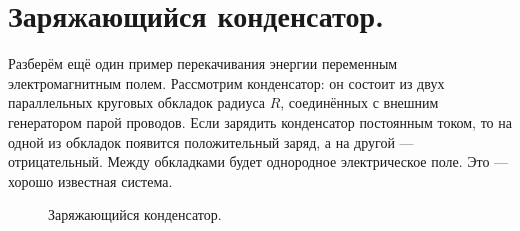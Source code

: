 \documentclass[12pt,a4paper]{article}
\numberwithin{equation}{section}
\numberwithin{equation}{section}
\begin{document}
\section{Заряжающийся конденсатор.}
\label{sec:condensator}

Разберём ещё один пример перекачивания энергии переменным
электромагнитным полем. Рассмотрим конденсатор: он состоит из двух
параллельных круговых обкладок радиуса $R$, соединённых с внешним
генератором парой проводов. Если зарядить конденсатор постоянным
током, то на одной из обкладок появится положительный заряд, а на
другой --- отрицательный. Между обкладками будет однородное
электрическое поле. Это --- хорошо известная система. 

\begin{figure}[h]
  \centering
  \hspace{2cm}
  \caption{Заряжающийся конденсатор.}
  \label{fig:cond}
\end{figure}
\end{document}
